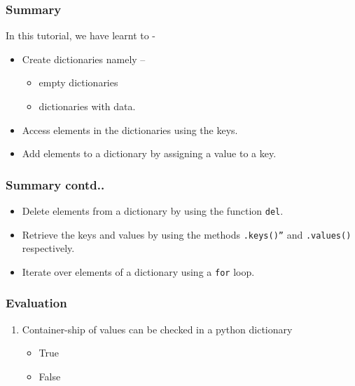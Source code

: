 \documentclass[17pt,compress]{beamer}
\newcounter{saveenumi}
\newcommand{\seti}{\setcounter{saveenumi}{\value{enumi}}}
\begin{document}
\begin{frame}
\frametitle{Summary}
\label{sec-8.1}

  In this tutorial, we have learnt to -

\begin{itemize}
\item Create dictionaries namely --
	\begin{itemize}
	\item empty dictionaries
	\item dictionaries with data.
	\end{itemize}
\item Access elements in the dictionaries using the keys.
\item Add elements to a dictionary by assigning a value to a key.
\end{itemize}
\end{frame}
\begin{frame}
\frametitle{Summary contd..}
\label{sec-8.2}

\begin{itemize}
\item Delete elements from a dictionary by using the function \texttt{del}.
\item Retrieve the keys and values by using the methods \texttt{.keys()''} and 
    \texttt{.values()} respectively.
\item Iterate over elements of a dictionary using a \texttt{for} loop.
\end{itemize}
\end{frame}
\begin{frame}[fragile]
\frametitle{Evaluation}
\label{sec-9.1}

\begin{enumerate}
\item Container-ship of values can be checked in a python dictionary
	\begin{itemize}
	\item True
	\item False
	\end{itemize}
\seti
\end{enumerate}
\end{frame}
\end{document}
